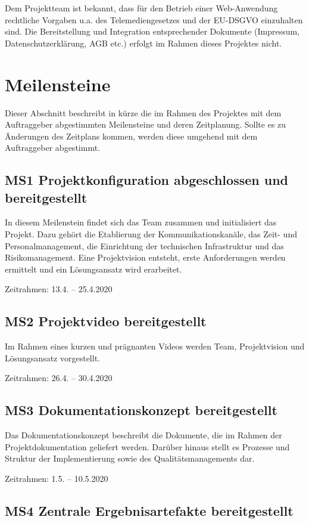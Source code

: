\documentclass[a4paper,11pt,listof=numbered,glossary=totoc,parskip=half,toc=bib]{scrreprt}
\begin{document}
Dem Projektteam ist bekannt, dass für den Betrieb einer Web-Anwendung rechtliche Vorgaben u.a. des Telemediengesetzes und der EU-DSGVO einzuhalten sind. Die Bereitstellung und Integration entsprechender Dokumente (Impressum, Datenschutzerklärung, AGB etc.) erfolgt im Rahmen dieses Projektes nicht.	
	
	\newpage
	\section{Meilensteine}
Dieser Abschnitt beschreibt in kürze die im Rahmen des Projektes mit dem Auftraggeber abgestimmten Meilensteine und deren Zeitplanung.
Sollte es zu Änderungen des Zeitplans kommen, werden diese umgehend mit dem Auftraggeber abgestimmt.

\subsection{MS1 Projektkonfiguration abgeschlossen und bereitgestellt}

In diesem Meilenstein findet sich das Team zusammen und initialisiert das Projekt. 
Dazu gehört die Etablierung der Kommunikationskanäle, das Zeit- und Personalmanagement, die Einrichtung der technischen Infrastruktur und das Risikomanagement.
Eine Projektvision entsteht, erste Anforderungen werden ermittelt und ein Lösungsansatz wird erarbeitet.

Zeitrahmen: 13.4. -- 25.4.2020


\subsection{MS2 Projektvideo bereitgestellt}

Im Rahmen eines kurzen und prägnanten Videos werden Team, Projektvision und Lösungsansatz vorgestellt.

Zeitrahmen: 26.4. -- 30.4.2020

\subsection{MS3 Dokumentationskonzept bereitgestellt}

Das Dokumentationskonzept beschreibt die Dokumente, die im Rahmen der Projektdokumentation geliefert werden. Darüber hinaus stellt es Prozesse und Struktur der Implementierung sowie des Qualitätsmanagements dar.

Zeitrahmen: 1.5. -- 10.5.2020

\subsection{MS4 Zentrale Ergebnisartefakte bereitgestellt}
\end{document}
